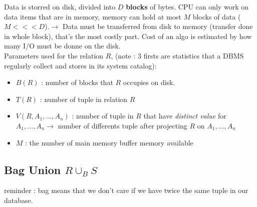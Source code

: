 \documentclass[12pt,a4paper]{article}
\begin{document}
Data is storred on disk, divided into $D$ \textbf{blocks} of bytes. CPU can only work on data items that are in memory, memory can hold at most $M$ blocks of data ($M <<< D$).$\rightarrow$ Data must be transferred from disk to memory (transfer done in whole block), that's the most costly part. Cost of an algo is estimated by how many I/O must be donne on the disk.\\
Parameters used for the relation $R$, (note : 3 firsts are statistics that a DBMS regularly collect and stores in its system catalog):
\begin{itemize}
\item $B(R)$ : number of blocks that $R$ occupies on disk.
\item $T(R)$ : number of tuple in relation $R$
\item $V(R,A_1,...,A_n)$ : number of tuple in $R$ that have \textit{distinct value} for $A_1,...,A_n \rightarrow$ number of differents tuple after projecting $R$ on $A_1,...,A_n$
\item $M$ : the number of main memory buffer memory available
\end{itemize}

\subsection{Bag Union $R \cup_B S$}
reminder : bag means that we don't care if we have twice the same tuple in our database.\\
\end{document}
